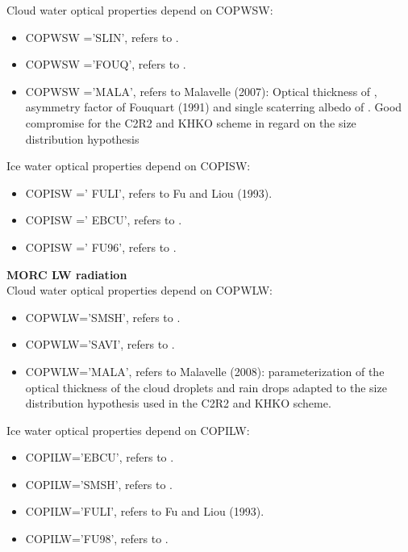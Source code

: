 Cloud water optical properties depend on COPWSW:

\begin{itemize}

\item COPWSW ='SLIN', refers to \cite{Slingo1989}.

\item COPWSW ='FOUQ', refers to \citet{Fouquart1987}.

 \item COPWSW ='MALA', refers to Malavelle (2007): Optical thickness of \citet{Savijarvi1997}, asymmetry factor of Fouquart (1991) and single scaterring albedo of \citet{Slingo1989}. Good compromise for the C2R2 and KHKO scheme in regard on the size distribution hypothesis

\end{itemize}

Ice water optical properties depend on COPISW:
\begin{itemize}

\item COPISW =' FULI', refers to Fu and Liou (1993).

\item COPISW =' EBCU', refers to \citet{Ebert1992}.

\item COPISW =' FU96', refers to \citet{FU1996}.

\end{itemize}


{\bf MORC LW radiation} \\

Cloud water optical properties depend on COPWLW:
\begin{itemize}

\item COPWLW='SMSH', refers to \citet{Smith1992}.

\item COPWLW='SAVI', refers to \citet{Savijarvi1997}.

\item COPWLW='MALA', refers to Malavelle (2008): parameterization of the optical thickness of the cloud droplets and rain drops adapted to the size distribution hypothesis used in the C2R2 and KHKO scheme.

\end{itemize}

Ice water optical properties depend on COPILW:
\begin{itemize}
\item COPILW='EBCU', refers to \citet{Ebert1992}.

\item COPILW='SMSH', refers to \citet{Smith1992}.

\item COPILW='FULI', refers to Fu and Liou (1993).

\item COPILW='FU98', refers to \citet{Fu1998}.
\end{itemize}

